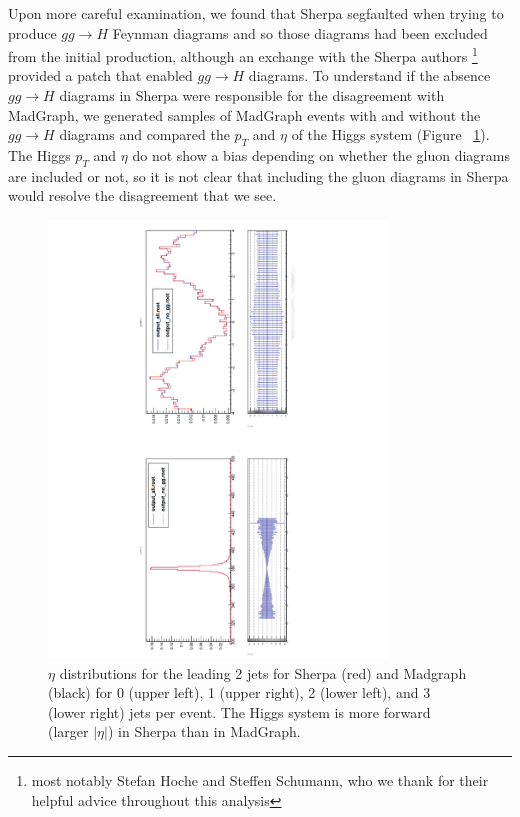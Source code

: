 Upon more careful examination, we found that Sherpa segfaulted when trying to produce 
$gg\rightarrow H$ Feynman diagrams and so those diagrams had been excluded from
the initial production, although
an exchange with the Sherpa authors \footnote{most notably Stefan Hoche and Steffen 
Schumann, who we thank for their helpful advice throughout this analysis} provided 
a patch that enabled $gg\rightarrow H$ diagrams.  To understand
if the absence $gg\rightarrow H$ diagrams in Sherpa were responsible for the disagreement
with MadGraph, we generated samples of MadGraph events with and without the $gg\rightarrow H$
diagrams and compared the $p_T$ and $\eta$ of the Higgs system (Figure ~\ref{fig:ggH}).
The Higgs $p_T$ and $\eta$ do not show a bias depending on whether the gluon diagrams
are included or not, so it is not clear that including the gluon diagrams in Sherpa would
resolve the disagreement that we see. 

\begin{figure}
  \center
  \includegraphics[width=0.8\textwidth, angle=270]{MonteCarlo/figures/ggH.pdf}
  \caption{$\eta$ distributions for the leading 2 jets for Sherpa (red) and Madgraph (black) for 0 (upper
  left), 1 (upper right), 2 (lower left), and 3 (lower right) jets per event. 
  The Higgs system is more forward (larger $|\eta|$) in Sherpa than in MadGraph.  \label{fig:ggH}}
\end{figure}




